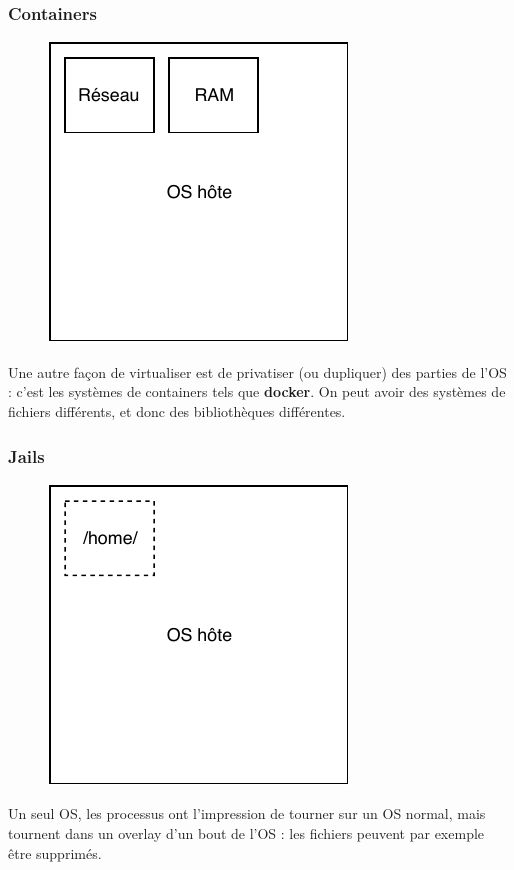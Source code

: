 \documentclass[11pt]{article}
\begin{document}
\subsubsection{Containers}
\begin{figure}[ht]
    \centering
    \includegraphics{img/c3-container.pdf}
\end{figure}

Une autre façon de virtualiser est de privatiser (ou dupliquer) des parties de l'OS : c'est les systèmes de containers tels que \textbf{docker}. On peut avoir des systèmes de fichiers différents, et donc des bibliothèques différentes.

\subsubsection{Jails}
\begin{figure}[ht]
    \centering
    \includegraphics{img/c3-jails.pdf}
\end{figure}

Un seul OS, les processus ont l'impression de tourner sur un OS normal, mais tournent dans un overlay d'un bout de l'OS : les fichiers peuvent par exemple être supprimés.
\end{document}
